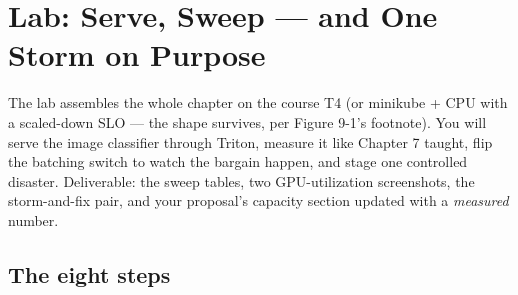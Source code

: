 \section{Lab: Serve, Sweep — and One Storm on Purpose}

The lab assembles the whole chapter on the course T4 (or minikube + CPU with a scaled-down SLO — the shape survives, per Figure 9-1's footnote). You will serve the image classifier through Triton, measure it like Chapter 7 taught, flip the batching switch to watch the bargain happen, and stage one controlled disaster. Deliverable: the sweep tables, two GPU-utilization screenshots, the storm-and-fix pair, and your proposal's capacity section updated with a \textit{measured} number.

\subsection*{The eight steps}

